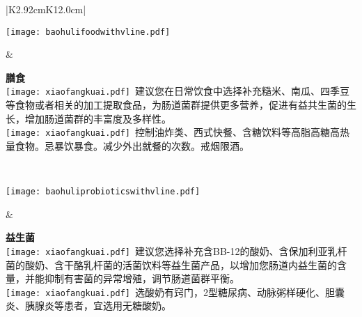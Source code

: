 \vspace*{-3mm}
\noindent
\fontsize{8pt}{11pt}\selectfont
{}
\setlength{\arrayrulewidth}{.5pt}
\begin{center}
\begin{tabular}{|K{2.92cm}K{12.0cm}|}
\hline

\parbox[c][4.7cm]{.95\hsize}{
\noindent
\texttt{[image: baohulifoodwithvline.pdf]}
}
 &
\hspace*{4mm}
\parbox{.95\hsize}{
\vspace*{3mm}
\begin{spacing}{1.5}
{\fontsize{9pt}{10pt}\selectfont\bf 膳食\\}
{\texttt{[image: xiaofangkuai.pdf]}\fontsize{8pt}{10pt}\selectfont \ 建议您在日常饮食中选择补充糙米、南瓜、四季豆等食物或者相关的加工提取食品，为肠道菌群提供更多营养，促进有益共生菌的生长，增加肠道菌群的丰富度及多样性。\\}
{\texttt{[image: xiaofangkuai.pdf]}\fontsize{8pt}{10pt}\selectfont \ 控制油炸类、西式快餐、含糖饮料等高脂高糖高热量食物。忌暴饮暴食。减少外出就餐的次数。戒烟限酒。\\}
\end{spacing}
} \\
\hline

\parbox[c][4.7cm]{.95\hsize}{
\noindent
\texttt{[image: baohuliprobioticswithvline.pdf]}
}
 &
\hspace*{4mm}
\parbox{.95\hsize}{
\vspace*{3mm}
\begin{spacing}{1.5}
{\fontsize{9pt}{10pt}\selectfont\bf 益生菌\\}
{\texttt{[image: xiaofangkuai.pdf]}\fontsize{8pt}{10pt}\selectfont \ 建议您选择补充含BB-12的酸奶、含保加利亚乳杆菌的酸奶、含干酪乳杆菌的活菌饮料等益生菌产品，以增加您肠道内益生菌的含量，并能抑制有害菌的异常增殖，调节肠道菌群平衡。\\}
{\texttt{[image: xiaofangkuai.pdf]}\fontsize{8pt}{10pt}\selectfont \ 选酸奶有窍门，2型糖尿病、动脉粥样硬化、胆囊炎、胰腺炎等患者，宜选用无糖酸奶。\\}
\end{spacing}
} \\
\hline


\end{tabular}
\end{center}
